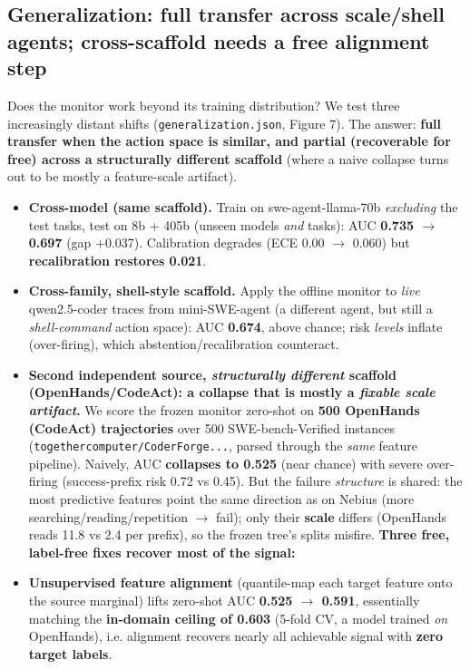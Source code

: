 \subsection{Generalization: full transfer across scale/shell agents; cross-scaffold needs a free alignment step}
Does the monitor work beyond its training distribution? We test three increasingly distant shifts (\texttt{generalization.json}, Figure 7). The answer: \textbf{full transfer when the action space is similar, and partial (recoverable for free) across a structurally different scaffold} (where a naive collapse turns out to be mostly a feature-scale artifact).

\begin{itemize}
\item \textbf{Cross-model (same scaffold).} Train on swe-agent-llama-70b \emph{excluding} the test tasks, test on 8b + 405b (unseen models \emph{and} tasks): AUC \textbf{0.735 $\to$ 0.697} (gap +0.037). Calibration degrades (ECE 0.00 $\to$ 0.060) but \textbf{recalibration restores 0.021}.
\item \textbf{Cross-family, shell-style scaffold.} Apply the offline monitor to \emph{live} qwen2.5-coder traces from mini-SWE-agent (a different agent, but still a \emph{shell-command} action space): AUC \textbf{0.674}, above chance; risk \emph{levels} inflate (over-firing), which abstention/recalibration counteract.
\item \textbf{Second independent source, \emph{structurally different} scaffold (OpenHands/CodeAct): a collapse that is mostly a \emph{fixable scale artifact}.} We score the frozen monitor zero-shot on \textbf{500 OpenHands (CodeAct) trajectories} over 500 SWE-bench-Verified instances (\texttt{togethercomputer/CoderForge...}, parsed through the \emph{same} feature pipeline). Naively, AUC \textbf{collapses to 0.525} (near chance) with severe over-firing (success-prefix risk 0.72 vs 0.45). But the failure \emph{structure} is shared: the most predictive features point the same direction as on Nebius (more searching/reading/repetition $\to$ fail); only their \textbf{scale} differs (OpenHands reads 11.8 vs 2.4 per prefix), so the frozen tree's splits misfire. \textbf{Three free, label-free fixes recover most of the signal:}
\item \textbf{Unsupervised feature alignment} (quantile-map each target feature onto the source marginal) lifts zero-shot AUC \textbf{0.525 $\to$ 0.591}, essentially matching the \textbf{in-domain ceiling of 0.603} (5-fold CV, a model trained \emph{on} OpenHands), i.e. alignment recovers nearly all achievable signal with \textbf{zero target labels}.

\end{itemize}
